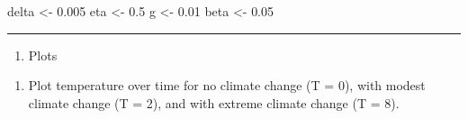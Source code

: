 \documentclass[]{article}
\newenvironment{Shaded}{\begin{snugshade}}{\end{snugshade}}
\newcommand{\FloatTok}[1]{\textcolor[rgb]{0.00,0.00,0.81}{#1}}
\newcommand{\NormalTok}[1]{#1}
\newcommand{\StringTok}[1]{\textcolor[rgb]{0.31,0.60,0.02}{#1}}
\providecommand{\tightlist}{%
  \setlength{\itemsep}{0pt}\setlength{\parskip}{0pt}}
\begin{document}
\begin{Shaded}
\begin{Highlighting}[]
\NormalTok{delta <-}\StringTok{ }\FloatTok{0.005}
\NormalTok{eta <-}\StringTok{ }\FloatTok{0.5}
\NormalTok{g <-}\StringTok{ }\FloatTok{0.01}
\NormalTok{beta <-}\StringTok{ }\FloatTok{0.05}
\end{Highlighting}
\end{Shaded}

\begin{center}\rule{0.5\linewidth}{0.5pt}\end{center}

\begin{enumerate}
\def\labelenumi{\arabic{enumi}.}
\tightlist
\item
  Plots
\end{enumerate}

\begin{enumerate}
\def\labelenumi{(\alph{enumi})}
\tightlist
\item
  Plot temperature over time for no climate change (T = 0), with modest
  climate change (T = 2), and with extreme climate change (T = 8).
\end{enumerate}
\end{document}
